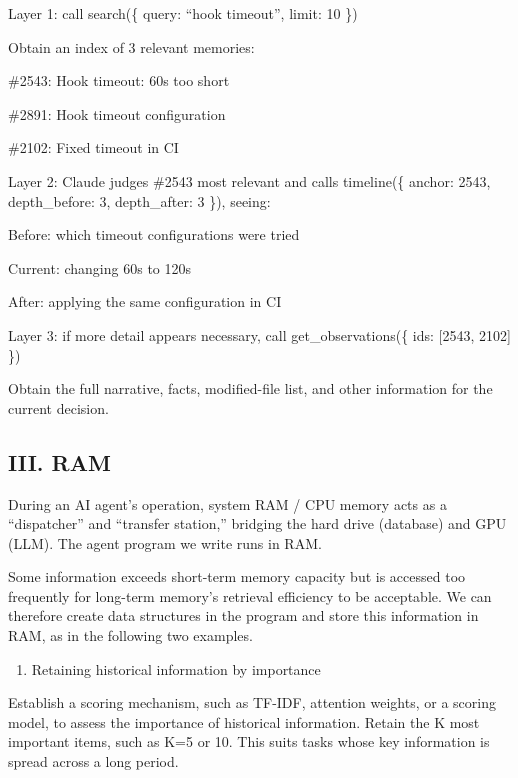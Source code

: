 Layer 1: call search(\{ query: ``hook timeout'', limit: 10 \})

Obtain an index of 3 relevant memories:

\#2543: Hook timeout: 60s too short

\#2891: Hook timeout configuration

\#2102: Fixed timeout in CI

Layer 2: Claude judges \#2543 most relevant and calls timeline(\{ anchor: 2543, depth\_before: 3, depth\_after: 3 \}), seeing:

Before: which timeout configurations were tried

Current: changing 60s to 120s

After: applying the same configuration in CI

Layer 3: if more detail appears necessary, call get\_observations(\{ ids: {[}2543, 2102{]} \})

Obtain the full narrative, facts, modified-file list, and other information for the current decision.

\hypertarget{iii.-ram}{%
\subsection{III. RAM}\label{iii.-ram}}

During an AI agent's operation, system RAM / CPU memory acts as a ``dispatcher'' and ``transfer station,'' bridging the hard drive (database) and GPU (LLM). The agent program we write runs in RAM.

Some information exceeds short-term memory capacity but is accessed too frequently for long-term memory's retrieval efficiency to be acceptable. We can therefore create data structures in the program and store this information in RAM, as in the following two examples.

\begin{enumerate}
\def\labelenumi{\arabic{enumi}.}
\tightlist
\item
  Retaining historical information by importance
\end{enumerate}

Establish a scoring mechanism, such as TF-IDF, attention weights, or a scoring model, to assess the importance of historical information. Retain the K most important items, such as K=5 or 10. This suits tasks whose key information is spread across a long period.

